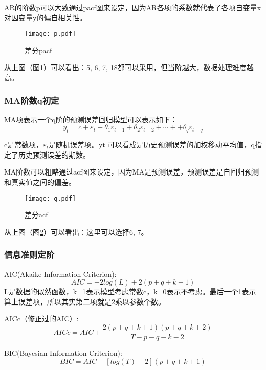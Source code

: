 \documentclass[a4paper,AutoFakeBold,AutoFakeSlant]{ctexart}
\begin{document}
AR的阶数p可以大致通过pacf图来设定，因为AR各项的系数就代表了各项自变量x对因变量y的偏自相关性。

\begin{figure}[H]
  \centering
  \texttt{[image: p.pdf]}
  \caption{差分pacf}
  \label{f9}
\end{figure}

从上图（图\ref{f9}）可以看出：5, 6, 7, 18都可以采用，但当阶越大，数据处理难度越高。

\subsubsection{MA阶数q初定}

MA项表示一个q阶的预测误差回归模型可以表示如下：
\begin{equation}
  y_t = c + \varepsilon_t + \theta_1\varepsilon_{t-1} + \theta_2\varepsilon_{t-2} + \cdots + + \theta_q\varepsilon_{t-q}
\end{equation}

c是常数项，$\varepsilon_t$是随机误差项。yt 可以看成是历史预测误差的加权移动平均值，q指定了历史预测误差的期数。

MA阶数可以粗略通过acf图来设定，因为MA是预测误差，预测误差是自回归预测和真实值之间的偏差。

\begin{figure}[H]
  \centering
  \texttt{[image: q.pdf]}
  \caption{差分acf}
  \label{f10}
\end{figure}
从上图（图\ref{f10}）可以看出：这里可以选择6, 7。

\subsubsection{信息准则定阶}

AIC(Akaike Information Criterion):
\begin{equation}
  AIC = -2 log(L) + 2(p + q + k + 1)
\end{equation}
L是数据的似然函数，k=1表示模型考虑常数c，k=0表示不考虑。最后一个1表示算上误差项，所以其实第二项就是2乘以参数个数。

AICc（修正过的AIC）:
\begin{equation}
  AICc = AIC + \frac{2(p+q+k+1)(p+q+k+2)}{T-p-q-k-2}
\end{equation}

BIC(Bayesian Information Criterion):
\begin{equation}
  BIC = AIC + \left[log(T)-2\right](p+q+k+1)
\end{equation}
\end{document}
